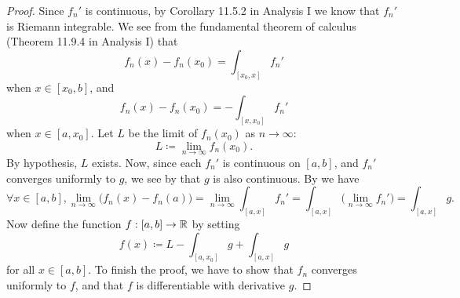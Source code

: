 \begin{proof}
  Since \(f_n'\) is continuous, by Corollary 11.5.2 in Analysis I we know that \(f_n'\) is Riemann integrable.
  We see from the fundamental theorem of calculus (Theorem 11.9.4 in Analysis I) that
  \[
    f_n(x) - f_n(x_0) = \int_{[x_0, x]} f_n'
  \]
  when \(x \in [x_0, b]\), and
  \[
    f_n(x) - f_n(x_0) = -\int_{[x, x_0]} f_n'
  \]
  when \(x \in [a, x_0]\).
  Let \(L\) be the limit of \(f_n(x_0)\) as \(n \to \infty\):
  \[
    L \coloneqq \lim_{n \to \infty} f_n(x_0).
  \]
  By hypothesis, \(L\) exists.
  Now, since each \(f_n'\) is continuous on \([a, b]\), and \(f_n'\) converges uniformly to \(g\), we see by  that \(g\) is also continuous.
  By  we have
  \[
    \forall x \in [a, b], \lim_{n \to \infty} \big(f_n(x) - f_n(a)\big) = \lim_{n \to \infty} \int_{[a, x]} f_n' = \int_{[a, x]} \big(\lim_{n \to \infty} f_n'\big) = \int_{[a, x]} g.
  \]
  Now define the function \(f : [a, b] \to \mathbb{R}\) by setting
  \[
    f(x) \coloneqq L - \int_{[a, x_0]} g + \int_{[a, x]} g
  \]
  for all \(x \in [a, b]\).
  To finish the proof, we have to show that \(f_n\) converges uniformly to \(f\), and that \(f\) is differentiable with derivative \(g\).


\end{proof}
